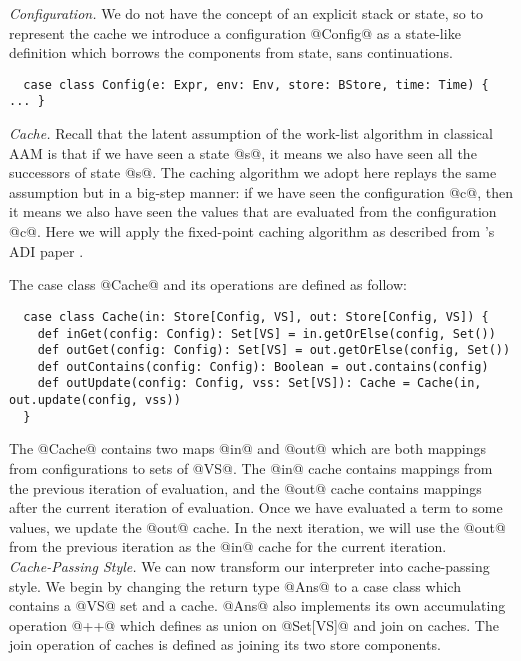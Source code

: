 \documentclass[acmsmall, review]{acmart}\settopmatter{}
\begin{document}
\textit{Configuration.}
We do not have the concept of an explicit stack or state, so to represent the cache 
we introduce a configuration @Config@ as a state-like definition which borrows the 
components from state, sans continuations.

\begin{lstlisting}
  case class Config(e: Expr, env: Env, store: BStore, time: Time) { ... }
\end{lstlisting}

\textit{Cache.}
Recall that the latent assumption of the work-list algorithm in classical AAM is that 
if we have seen a state @s@, it means we also have seen all the successors of state @s@.
The caching algorithm we adopt here replays the same assumption but in a big-step 
manner: if we have seen the configuration @c@, then it means we also have seen the 
values that are evaluated from the configuration @c@.
Here we will apply the fixed-point caching algorithm as described from
\citeauthor{darais2017abstracting}'s ADI paper \cite{darais2017abstracting}.

The case class @Cache@ and its operations are defined as follow:

\begin{lstlisting}
  case class Cache(in: Store[Config, VS], out: Store[Config, VS]) {
    def inGet(config: Config): Set[VS] = in.getOrElse(config, Set())
    def outGet(config: Config): Set[VS] = out.getOrElse(config, Set())
    def outContains(config: Config): Boolean = out.contains(config)
    def outUpdate(config: Config, vss: Set[VS]): Cache = Cache(in, out.update(config, vss))
  }
\end{lstlisting}

The @Cache@ contains two maps @in@ and @out@ which are both mappings from configurations 
to sets of @VS@. The @in@ cache contains mappings from the previous iteration of evaluation, 
and the @out@ cache contains mappings after the current iteration of evaluation. 
Once we have evaluated a term to some values, we update the @out@ cache. In the next 
iteration, we will use the @out@ from the previous iteration as the @in@ cache for the 
current iteration. \\

\textit{Cache-Passing Style.}
We can now transform our interpreter into cache-passing style. We begin by changing the 
return type @Ans@ to a case class which contains a @VS@ set and a cache. @Ans@ also implements 
its own accumulating operation @++@ which defines as union on @Set[VS]@ and join on caches.
The join operation of caches is defined as joining its two store components.
\end{document}
